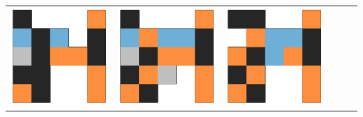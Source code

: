\begin{tabular}{cccccc}
    \includegraphics[scale=0.1]{images/top_designs/walker/ga/ga3_gen29_ind3} &
    \includegraphics[scale=0.1]{images/top_designs/walker/ga/ga3_gen29_ind4} &
    \includegraphics[scale=0.1]{images/top_designs/walker/ga/ga3_gen29_ind5} \\

\end{tabular}
